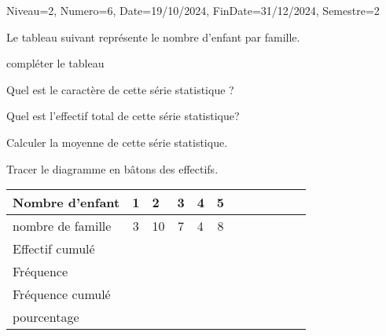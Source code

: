 \documentclass[a4paper,12pt]{article}
\begin{document}
\begin{Maquette}[DM]{Niveau=2, Numero=6, Date=19/10/2024, FinDate=31/12/2024, Semestre=2}


\begin{exercice}
\begin{enumerate}
\begin{minipage}{.55\linewidth}
Le tableau suivant représente le nombre d'enfant par famille.
\item compléter le tableau
\item Quel est le caractère de cette série statistique ?
\item Quel est l'effectif total de cette série statistique?
\item Calculer la moyenne de cette série statistique.
\item Tracer le diagramme en bâtons des effectifs.
\end{minipage}
\begin{minipage}{.45\linewidth}
\begin{tabular}{|Oc|Oc|Oc|Oc|Oc|Oc|}
\hline 
Nombre d'enfant & 1 & 2 & 3 & 4 & 5 \\ 
\hline 
nombre de famille & 3 & 10 & 7 & 4 & 8 \\ 
\hline 
Effectif cumulé  &  &  &  &  &  \\ 
\hline
Fréquence  &  &  &  &  &  \\ 
\hline 
Fréquence cumulé  &  &  &  &  &  \\ 
\hline
pourcentage &  &  &  &  &  \\ 
\hline 
\end{tabular} 
\end{minipage}
\end{enumerate}
\end{exercice}


\end{Maquette}
\end{document}
